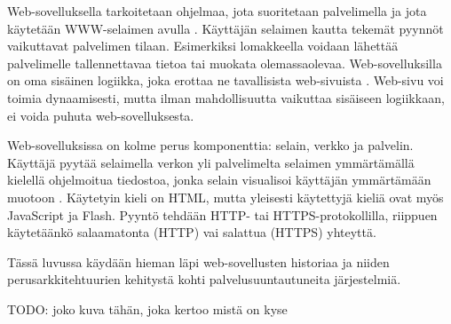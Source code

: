 Web-sovelluksella tarkoitetaan ohjelmaa, jota suoritetaan palvelimella ja jota käytetään WWW-selaimen avulla \cite{uml}. Käyttäjän selaimen kautta tekemät pyynnöt vaikuttavat palvelimen tilaan. Esimerkiksi lomakkeella voidaan lähettää palvelimelle tallennettavaa tietoa tai muokata olemassaolevaa. Web-sovelluksilla on oma sisäinen logiikka, joka erottaa ne tavallisista web-sivuista \cite{uml}. Web-sivu voi toimia dynaamisesti, mutta ilman mahdollisuutta vaikuttaa sisäiseen logiikkaan, ei voida puhuta web-sovelluksesta.

Web-sovelluksissa on kolme perus komponenttia: selain, verkko ja palvelin. Käyttäjä pyytää selaimella verkon yli palvelimelta selaimen ymmärtämällä kielellä ohjelmoitua tiedostoa, jonka selain visualisoi käyttäjän ymmärtämään muotoon \cite{uml}. Käytetyin kieli on HTML, mutta yleisesti käytettyjä kieliä ovat myös JavaScript ja Flash. Pyyntö tehdään HTTP- tai HTTPS-protokollilla, riippuen käytetäänkö salaamatonta (HTTP) vai salattua (HTTPS) yhteyttä.

Tässä luvussa käydään hieman läpi web-sovellusten historiaa ja niiden perusarkkitehtuurien kehitystä kohti palvelusuuntautuneita järjestelmiä.

TODO: joko kuva tähän, joka kertoo mistä on kyse